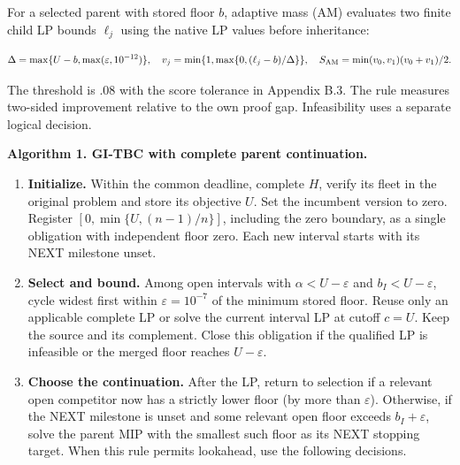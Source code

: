 \documentclass[
  american,
  11pt,
]{article}
\begin{document}
For a selected parent with stored floor \(b\), adaptive mass (AM)
evaluates two finite child LP bounds \(\ell_j\) using the native LP
values before inheritance:

\[
\Delta=\max\{U-b,\max(\varepsilon,10^{-12})\},\quad
v_j=\min\{1,\max\{0,(\ell_j-b)/\Delta\}\},\quad
S_{\rm AM}=\min(v_0,v_1)(v_0+v_1)/2.
\]

The threshold is .08 with the score tolerance in Appendix B.3. The rule
measures two-sided improvement relative to the own proof gap.
Infeasibility uses a separate logical decision.

\textbf{Algorithm 1. GI-TBC with complete parent continuation.}

\begin{enumerate}
\def\labelenumi{\arabic{enumi}.}
\item
  \textbf{Initialize.} Within the common deadline, complete \(H\),
  verify its fleet in the original problem and store its objective
  \(U\). Set the incumbent version to zero. Register
  \([0,\min\{U,(n-1)/n\}]\), including the zero boundary, as a single
  obligation with independent floor zero. Each new interval starts with
  its NEXT milestone unset.
\item
  \textbf{Select and bound.} Among open intervals with
  \(\alpha<U-\varepsilon\) and \(b_I<U-\varepsilon\), cycle widest first
  within \(\varepsilon=10^{-7}\) of the minimum stored floor. Reuse only
  an applicable complete LP or solve the current interval LP at cutoff
  \(c=U\). Keep the source and its complement. Close this obligation if
  the qualified LP is infeasible or the merged floor reaches
  \(U-\varepsilon\).
\item
  \textbf{Choose the continuation.} After the LP, return to selection if
  a relevant open competitor now has a strictly lower floor (by more
  than \(\varepsilon\)). Otherwise, if the NEXT milestone is unset and
  some relevant open floor exceeds \(b_I+\varepsilon\), solve the parent
  MIP with the smallest such floor as its NEXT stopping target. When
  this rule permits lookahead, use the following decisions.


\end{enumerate}
\end{document}
